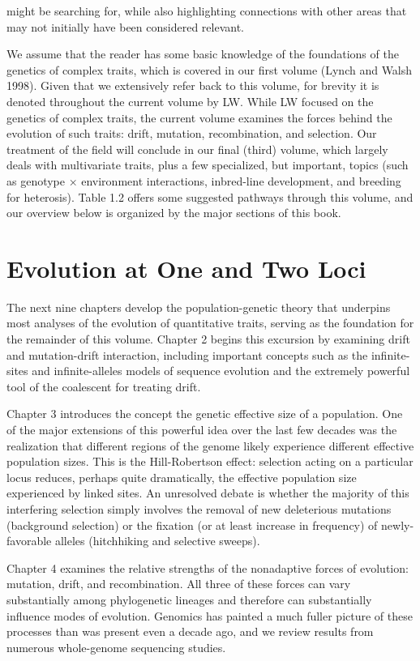 \documentclass{article}
\begin{document}
might be searching for, while also highlighting connections with other areas that may not initially have been considered relevant.

We assume that the reader has some basic knowledge of the foundations of the genetics of complex traits, which is covered in our first volume (Lynch and Walsh 1998). Given that we extensively refer back to this volume, for brevity it is denoted throughout the current volume by LW. While LW focused on the genetics of complex traits, the current volume examines the forces behind the evolution of such traits: drift, mutation, recombination, and selection. Our treatment of the field will conclude in our final (third) volume, which largely deals with multivariate traits, plus a few specialized, but important, topics (such as genotype × environment interactions, inbred-line development, and breeding for heterosis). Table 1.2 offers some suggested pathways through this volume, and our overview below is organized by the major sections of this book.

\section{Evolution at One and Two Loci}
The next nine chapters develop the population-genetic theory that underpins most analyses of the evolution of quantitative traits, serving as the foundation for the remainder of this volume. Chapter 2 begins this excursion by examining drift and mutation-drift interaction, including important concepts such as the infinite-sites and infinite-alleles models of sequence evolution and the extremely powerful tool of the coalescent for treating drift.

Chapter 3 introduces the concept the genetic effective size of a population. One of the major extensions of this powerful idea over the last few decades was the realization that different regions of the genome likely experience different effective population sizes. This is the Hill-Robertson effect: selection acting on a particular locus reduces, perhaps quite dramatically, the effective population size experienced by linked sites. An unresolved debate is whether the majority of this interfering selection simply involves the removal of new deleterious mutations (background selection) or the fixation (or at least increase in frequency) of newly-favorable alleles (hitchhiking and selective sweeps).

Chapter 4 examines the relative strengths of the nonadaptive forces of evolution: mutation, drift, and recombination. All three of these forces can vary substantially among phylogenetic lineages and therefore can substantially influence modes of evolution. Genomics has painted a much fuller picture of these processes than was present even a decade ago, and we review results from numerous whole-genome sequencing studies.
\end{document}
